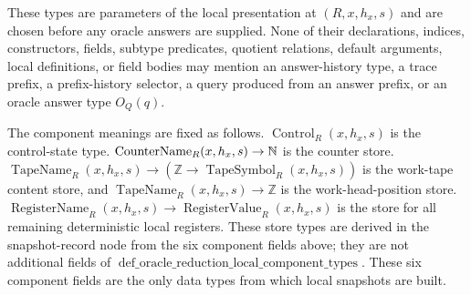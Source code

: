 \begin{definition}
  These types are parameters of the local presentation at $(R,x,h_x,s)$ and
  are chosen before any oracle answers are supplied.  None of their
  declarations, indices, constructors, fields, subtype predicates, quotient
  relations, default arguments, local definitions, or field bodies may mention
  an answer-history type, a trace prefix, a prefix-history selector, a query
  produced from an answer prefix, or an oracle answer type $O_Q(q)$.

  The component meanings are fixed as follows.
  $\operatorname{Control}_R(x,h_x,s)$ is the control-state type.
  $\operatorname{CounterName}_R(x,h_x,s)\to\mathbb{N}$ is the counter store.
  $\operatorname{TapeName}_R(x,h_x,s)\to(\mathbb{Z}\to
  \operatorname{TapeSymbol}_R(x,h_x,s))$ is the work-tape content store, and
  $\operatorname{TapeName}_R(x,h_x,s)\to\mathbb{Z}$ is the
  work-head-position store.  $\operatorname{RegisterName}_R(x,h_x,s)\to
  \operatorname{RegisterValue}_R(x,h_x,s)$ is the store for all remaining
  deterministic local registers.  These store types are derived in the
  snapshot-record node from the six component fields above; they are not
  additional fields of
  $\operatorname{def\_oracle\_reduction\_local\_component\_types}$.  These
  six component fields are the only data types from which local snapshots are
  built.
\end{definition}

